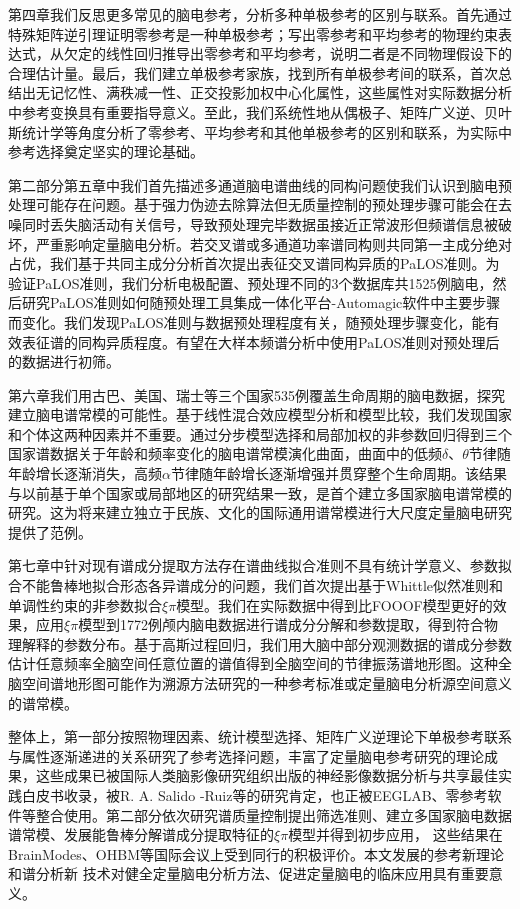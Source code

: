 第四章我们反思更多常见的脑电参考，分析多种单极参考的区别与联系。首先通过特殊矩阵逆引理证明零参考是一种单极参考；写出零参考和平均参考的物理约束表达式，从欠定的线性回归推导出零参考和平均参考，说明二者是不同物理假设下的合理估计量。最后，我们建立单极参考家族，找到所有单极参考间的联系，首次总结出无记忆性、满秩减一性、正交投影加权中心化属性，这些属性对实际数据分析中参考变换具有重要指导意义。至此，我们系统性地从偶极子、矩阵广义逆、贝叶斯统计学等角度分析了零参考、平均参考和其他单极参考的区别和联系，为实际中参考选择奠定坚实的理论基础。

第二部分第五章中我们首先描述多通道脑电谱曲线的同构问题使我们认识到脑电预处理可能存在问题。基于强力伪迹去除算法但无质量控制的预处理步骤可能会在去噪同时丢失脑活动有关信号，导致预处理完毕数据虽接近正常波形但频谱信息被破坏，严重影响定量脑电分析。若交叉谱或多通道功率谱同构则共同第一主成分绝对占优，我们基于共同主成分分析首次提出表征交叉谱同构异质的PaLOS准则。为验证PaLOS准则，我们分析电极配置、预处理不同的3个数据库共1525例脑电，然后研究PaLOS准则如何随预处理工具集成一体化平台-Automagic软件中主要步骤而变化。我们发现PaLOS准则与数据预处理程度有关，随预处理步骤变化，能有效表征谱的同构异质程度。有望在大样本频谱分析中使用PaLOS准则对预处理后的数据进行初筛。

第六章我们用古巴、美国、瑞士等三个国家535例覆盖生命周期的脑电数据，探究建立脑电谱常模的可能性。基于线性混合效应模型分析和模型比较，我们发现国家和个体这两种因素并不重要。通过分步模型选择和局部加权的非参数回归得到三个国家谱数据关于年龄和频率变化的脑电谱常模演化曲面，曲面中的低频$\delta$、$\theta$节律随年龄增长逐渐消失，高频$\alpha$节律随年龄增长逐渐增强并贯穿整个生命周期。该结果与以前基于单个国家或局部地区的研究结果一致，是首个建立多国家脑电谱常模的研究。这为将来建立独立于民族、文化的国际通用谱常模进行大尺度定量脑电研究提供了范例。

第七章中针对现有谱成分提取方法存在谱曲线拟合准则不具有统计学意义、参数拟合不能鲁棒地拟合形态各异谱成分的问题，我们首次提出基于Whittle似然准则和单调性约束的非参数拟合$\xi\pi$模型。我们在实际数据中得到比FOOOF模型更好的效果，应用$\xi\pi$模型到1772例颅内脑电数据进行谱成分分解和参数提取，得到符合物理解释的参数分布。基于高斯过程回归，我们用大脑中部分观测数据的谱成分参数估计任意频率全脑空间任意位置的谱值得到全脑空间的节律振荡谱地形图。这种全脑空间谱地形图可能作为溯源方法研究的一种参考标准或定量脑电分析源空间意义的谱常模。

整体上，第一部分按照物理因素、统计模型选择、矩阵广义逆理论下单极参考联系与属性逐渐递进的关系研究了参考选择问题，丰富了定量脑电参考研究的理论成果，这些成果已被国际人类脑影像研究组织出版的神经影像数据分析与共享最佳实践白皮书收录，被R. A. Salido
-Ruiz等的研究肯定，也正被EEGLAB、零参考软件等整合使用。第二部分依次研究谱质量控制提出筛选准则、建立多国家脑电数据谱常模、发展能鲁棒分解谱成分提取特征的$\xi\pi$模型并得到初步应用，
这些结果在BrainModes、OHBM等国际会议上受到同行的积极评价。本文发展的参考新理论和谱分析新
技术对健全定量脑电分析方法、促进定量脑电的临床应用具有重要意义。

